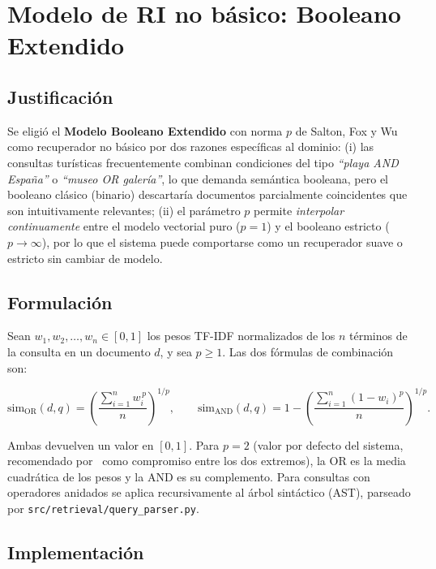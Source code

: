 \documentclass[runningheads,a4paper]{llncs}
\begin{document}
\section{Modelo de RI no b\'asico: Booleano Extendido}

\subsection{Justificaci\'on}

Se eligi\'o el \textbf{Modelo Booleano Extendido} con norma $p$ de Salton, Fox y Wu~\cite{salton1983extended} como recuperador no b\'asico por dos razones espec\'ificas al dominio: (i) las consultas tur\'isticas frecuentemente combinan condiciones del tipo \emph{``playa AND Espa\~na''} o \emph{``museo OR galer\'ia''}, lo que demanda sem\'antica booleana, pero el booleano cl\'asico (binario) descartar\'ia documentos parcialmente coincidentes que son intuitivamente relevantes; (ii) el par\'ametro $p$ permite \emph{interpolar continuamente} entre el modelo vectorial puro ($p{=}1$) y el booleano estricto ($p{\to}\infty$), por lo que el sistema puede comportarse como un recuperador suave o estricto sin cambiar de modelo.

\subsection{Formulaci\'on}

Sean $w_1, w_2, \dots, w_n \in [0,1]$ los pesos TF-IDF normalizados de los $n$ t\'erminos de la consulta en un documento $d$, y sea $p \geq 1$. Las dos f\'ormulas de combinaci\'on son:

\begin{equation}
\text{sim}_{\text{OR}}(d, q) = \left(\frac{\sum_{i=1}^{n} w_i^{\,p}}{n}\right)^{1/p}\!,\qquad
\text{sim}_{\text{AND}}(d, q) = 1 - \left(\frac{\sum_{i=1}^{n} (1 - w_i)^{p}}{n}\right)^{1/p}.
\end{equation}

Ambas devuelven un valor en $[0,1]$. Para $p{=}2$ (valor por defecto del sistema, recomendado por~\cite{salton1983extended} como compromiso entre los dos extremos), la OR es la media cuadr\'atica de los pesos y la AND es su complemento. Para consultas con operadores anidados se aplica recursivamente al \'arbol sint\'actico (AST), parseado por \texttt{src/retrieval/query\_parser.py}.

\subsection{Implementaci\'on}
\end{document}
